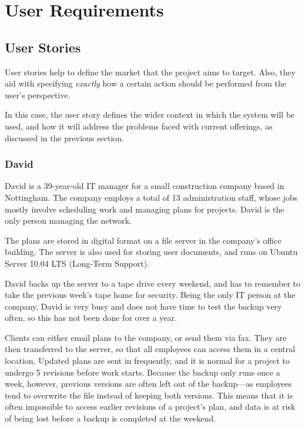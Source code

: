 \section{User Requirements}

\subsection{User Stories}

User stories help to define the market that the project aims to target. Also,
they aid with specifying \emph{exactly} how a certain action should be
performed from the user's perspective.

In this case, the user story defines the wider context in which the system will
be used, and how it will address the problems faced with current offerings, as
discussed in the previous section.

\subsubsection{David}

David is a 39-year-old IT manager for a small construction company based in
Nottingham. The company employs a total of 13 administration staff, whose jobs
mostly involve scheduling work and managing plans for projects. David is the
only person managing the network.

The plans are stored in digital format on a file server in the company's office
building. The server is also used for storing user documents, and runs on
Ubuntu Server 10.04 LTS (Long-Term Support).

David backs up the server to a tape drive every weekend, and has to remember to
take the previous week's tape home for security. Being the only IT person at
the company, David is very busy and does not have time to test the backup very
often, so this has not been done for over a year.

Clients can either email plans to the company, or send them via fax. They are
then transferred to the server, so that all employees can access them in
a central location. Updated plans are sent in frequently, and it is normal for
a project to undergo 5 revisions before work starts. Because the backup only
runs once a week, however, previous versions are often left out of the
backup---as employees tend to overwrite the file instead of keeping both
versions. This means that it is often impossible to access earlier revisions of
a project's plan, and data is at risk of being lost before a backup is
completed at the weekend.

